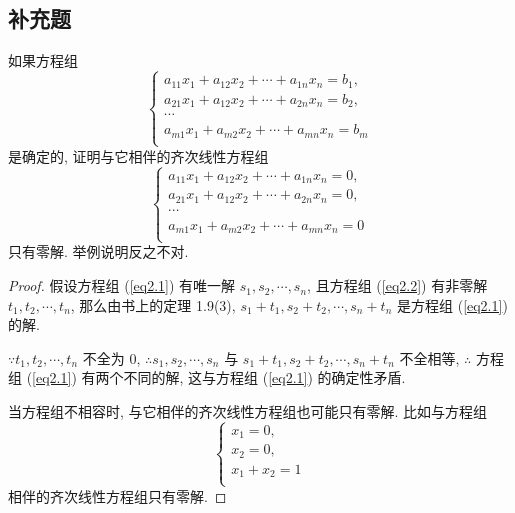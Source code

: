 \documentclass{ctexart}
\begin{document}
\subsection{补充题}
\begin{exercisec}[1.10]\label{exc1.10}
    如果方程组
    \begin{equation}\label{eq2.1}
        \begin{cases}
            a_{11}x_1+a_{12}x_2+\cdots+a_{1n}x_n=b_1, \\
            a_{21}x_1+a_{12}x_2+\cdots+a_{2n}x_n=b_2, \\
            \cdots \\
            a_{m1}x_1+a_{m2}x_2+\cdots+a_{mn}x_n=b_m \\
        \end{cases}
    \end{equation}
    是确定的, 证明与它相伴的齐次线性方程组
    \begin{equation}\label{eq2.2}
        \begin{cases}
            a_{11}x_1+a_{12}x_2+\cdots+a_{1n}x_n=0, \\
            a_{21}x_1+a_{12}x_2+\cdots+a_{2n}x_n=0, \\
            \cdots \\
            a_{m1}x_1+a_{m2}x_2+\cdots+a_{mn}x_n=0 \\
        \end{cases}
    \end{equation}
    只有零解. 举例说明反之不对.
\end{exercisec}
\begin{proof}
    假设方程组 (\ref{eq2.1}) 有唯一解 $s_1,s_2,\cdots,s_n$, 且方程组 (\ref{eq2.2}) 有非零解 $t_1,t_2,\cdots,t_n$, 那么由书上的定理 1.9(3), $s_1+t_1,s_2+t_2,\cdots,s_n+t_n$ 是方程组 (\ref{eq2.1}) 的解.
    
    $\because t_1,t_2,\cdots,t_n$ 不全为 $0$, $\therefore s_1,s_2,\cdots,s_n$ 与 $s_1+t_1,s_2+t_2,\cdots,s_n+t_n$ 不全相等, $\therefore$ 方程组 (\ref{eq2.1}) 有两个不同的解, 这与方程组 (\ref{eq2.1}) 的确定性矛盾.

    当方程组不相容时, 与它相伴的齐次线性方程组也可能只有零解. 比如与方程组
    \[\begin{cases}
        x_1=0, \\
        x_2=0, \\
        x_1+x_2=1 \\
    \end{cases}\]
    相伴的齐次线性方程组只有零解.
\end{proof}
\end{document}
